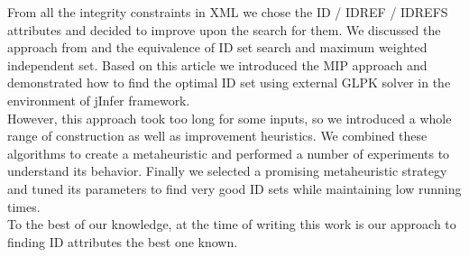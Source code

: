 
From all the integrity constraints in XML we chose the ID / IDREF / IDREFS attributes and decided to improve upon the search for them. We discussed the approach from \cite{fidax} and the equivalence of ID set search and maximum weighted independent set. Based on this article we introduced the MIP approach and demonstrated how to find the optimal ID set using external GLPK solver in the environment of jInfer framework.\\

However, this approach took too long for some inputs, so we introduced a whole range of construction as well as improvement heuristics. We combined these algorithms to create a metaheuristic and performed a number of experiments to understand its behavior. Finally we selected a promising metaheuristic strategy and tuned its parameters to find very good ID sets while maintaining low running times.\\

To the best of our knowledge, at the time of writing this work is our approach to finding ID attributes the best one known.